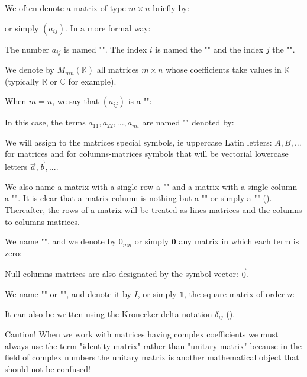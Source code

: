 	We often denote a matrix of type $m\times n$ briefly by:
	
	or simply $(a_{ij})$. In a more formal way:
	
	
	The number $a_{ij}$ is named "". The index $i$ is named the "" and the index $j$ the "".
	
	We denote by $M_{mn}(\mathbb{K})$ all matrices $m\times n$ whose coefficients take values in $\mathbb{K}$ (typically $\mathbb{R}$ or $\mathbb{C}$ for example).
	
	When $m=n$, we say that $(a_{ij})$ is a "\label{square matrix}":
		
	In this case, the terms $a_{11},a_{22},...,a_{nn}$ are named "" denoted by: 
	
	
	We will assign to the matrices special symbols, ie uppercase Latin letters: $A, B, ...$ for matrices and for columns-matrices symbols that will be vectorial lowercase letters $\vec{a},\vec{b},...$.
	
	We also name a matrix with a single row a "" and a matrix with a single column a "". It is clear that a matrix column is nothing but a "" or simply a "" (). Thereafter, the rows of a matrix will be treated as lines-matrices and the columns to columns-matrices.
	
	We name "", and we denote by $0_{mn}$ or simply $\mathbf{0}$ any matrix in which each term is zero:
		
	Null columns-matrices are also designated by the symbol vector: $\vec{0}$.
	
	We name "" or "", and denote it by $I$, or simply $\mathds{1}$, the square matrix of order $n$:
	
	It can also be written using the Kronecker delta notation $\delta_{ij}$ ().
	
	Caution! When we work with matrices having complex coefficients we must always use the term "identity matrix" rather than "unitary matrix" because in the field of complex numbers the unitary matrix is another mathematical object that should not be confused!
	
